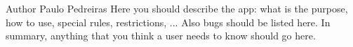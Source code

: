 \begin{DoxyAuthor}{Author}
Paulo Pedreiras Here you should describe the app\+: what is the purpose, how to use, special rules, restrictions, ... Also bugs should be listed here. In summary, anything that you think a user needs to know should go here. 
\end{DoxyAuthor}
